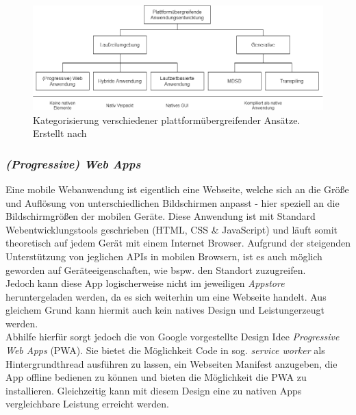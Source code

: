 \begin{figure}[h]
	\begin{center}
		\includegraphics[scale=0.47]{images/crossplattform_unterteilung.png}
	\end{center}
	\caption{Kategorisierung verschiedener plattformübergreifender Ansätze. Erstellt nach \cite{majchrzak2015} \protect}
	\label{fig:crossplattform_architecture}
\end{figure}

\subsubsection{\textit{(Progressive) Web Apps}}
Eine mobile Webanwendung ist eigentlich eine Webseite, welche sich an die Größe und Auflösung von unterschiedlichen Bildschirmen anpasst - hier speziell an die Bildschirmgrößen der mobilen Geräte. Diese Anwendung ist mit Standard Webentwicklungstools geschrieben (HTML, CSS \& JavaScript) und läuft somit theoretisch auf jedem Gerät mit einem Internet Browser. \cite{charland2011}
Aufgrund der steigenden Unterstützung von jeglichen APIs in mobilen Browsern, ist es auch möglich geworden auf Geräteeigenschaften, wie bspw. den Standort zuzugreifen.\\
Jedoch kann diese App logischerweise nicht im jeweiligen \textit{Appstore} heruntergeladen werden, da es sich weiterhin um eine Webseite handelt.
Aus gleichem Grund kann hiermit auch kein \glqq natives Design und Leistung\grqq erzeugt werden.\\

Abhilfe hierfür sorgt jedoch die von Google vorgestellte Design Idee \textit{Progressive Web Apps} (PWA). Sie bietet die Möglichkeit Code in sog. \textit{service worker} als Hintergrundthread ausführen zu lassen, ein Webseiten Manifest anzugeben, die App offline bedienen zu können und bieten die Möglichkeit die PWA zu installieren. Gleichzeitig kann mit diesem Design eine zu nativen Apps vergleichbare Leistung erreicht werden.\cite{bjorn-hansen2020} \\

